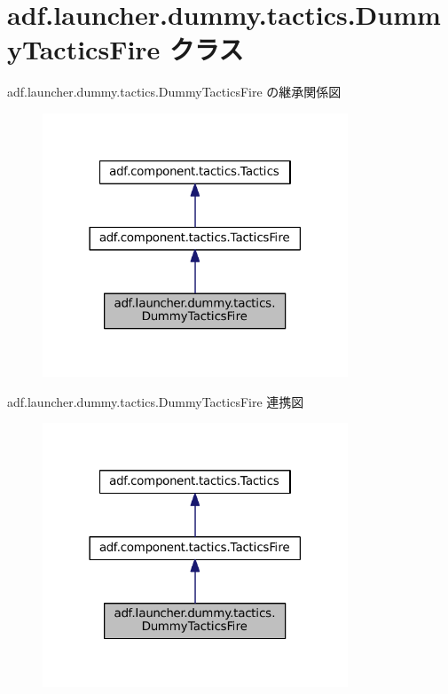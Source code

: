 \hypertarget{classadf_1_1launcher_1_1dummy_1_1tactics_1_1DummyTacticsFire}{}\section{adf.\+launcher.\+dummy.\+tactics.\+Dummy\+Tactics\+Fire クラス}
\label{classadf_1_1launcher_1_1dummy_1_1tactics_1_1DummyTacticsFire}


adf.\+launcher.\+dummy.\+tactics.\+Dummy\+Tactics\+Fire の継承関係図
\nopagebreak
\begin{figure}[H]
\begin{center}
\leavevmode
\includegraphics[width=258pt]{classadf_1_1launcher_1_1dummy_1_1tactics_1_1DummyTacticsFire__inherit__graph}
\end{center}
\end{figure}


adf.\+launcher.\+dummy.\+tactics.\+Dummy\+Tactics\+Fire 連携図
\nopagebreak
\begin{figure}[H]
\begin{center}
\leavevmode
\includegraphics[width=258pt]{classadf_1_1launcher_1_1dummy_1_1tactics_1_1DummyTacticsFire__coll__graph}
\end{center}
\end{figure}
